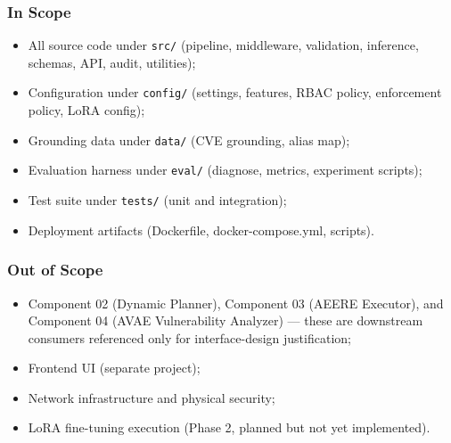 \documentclass[10pt,journal,onecolumn]{IEEEtran}
\begin{document}
\subsubsection{In Scope}
\begin{itemize}
\item All source code under \texttt{src/} (pipeline, middleware, validation, inference, schemas, API, audit, utilities);
\item Configuration under \texttt{config/} (settings, features, RBAC policy, enforcement policy, LoRA config);
\item Grounding data under \texttt{data/} (CVE grounding, alias map);
\item Evaluation harness under \texttt{eval/} (diagnose, metrics, experiment scripts);
\item Test suite under \texttt{tests/} (unit and integration);
\item Deployment artifacts (Dockerfile, docker-compose.yml, scripts).
\end{itemize}

\subsubsection{Out of Scope}
\begin{itemize}
\item Component 02 (Dynamic Planner), Component 03 (AEERE Executor), and Component 04 (AVAE Vulnerability Analyzer) --- these are downstream consumers referenced only for interface-design justification;
\item Frontend UI (separate project);
\item Network infrastructure and physical security;
\item LoRA fine-tuning execution (Phase 2, planned but not yet implemented).
\end{itemize}
\end{document}
